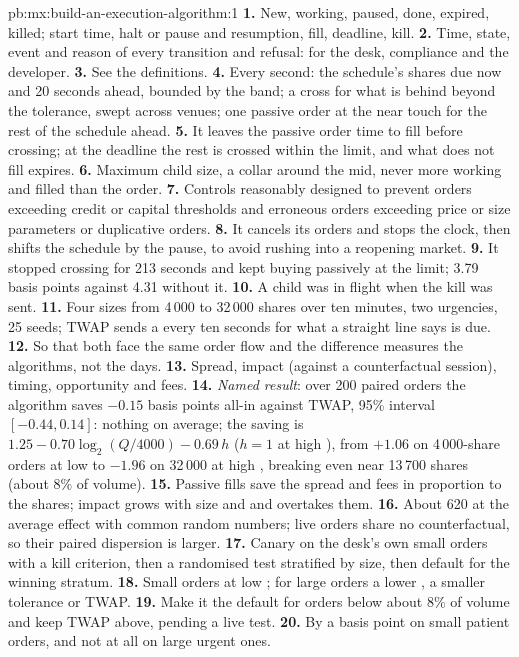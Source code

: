 \begin{solution}{pb:mx:build-an-execution-algorithm:1}
\textbf{1.} New, working, paused, done, expired, killed; start time, halt or pause and resumption, fill, deadline, kill.
\textbf{2.} Time, state, event and reason of every transition and refusal: for the desk, compliance and the developer.
\textbf{3.} See the definitions.
\textbf{4.} Every second: the schedule's shares due now and 20 seconds ahead, bounded by the band; a cross for what is behind beyond the tolerance,
swept across venues; one passive order at the near touch for the rest of the schedule ahead.
\textbf{5.} It leaves the passive order time to fill before crossing; at the deadline the rest is crossed within the limit, and what does not fill
expires.
\textbf{6.} Maximum child size, a collar around the mid, never more working and filled than the order.
\textbf{7.} Controls reasonably designed to prevent orders exceeding credit or capital thresholds and erroneous orders exceeding price or size parameters
or duplicative orders.
\textbf{8.} It cancels its orders and stops the clock, then shifts the schedule by the pause, to avoid rushing into a reopening market.
\textbf{9.} It stopped crossing for 213 seconds and kept buying passively at the limit; 3.79 basis points against 4.31 without it.
\textbf{10.} A child was in flight when the kill was sent.
\textbf{11.} Four sizes from 4\,000 to 32\,000 shares over ten minutes, two urgencies, 25 seeds; TWAP sends a  every ten seconds for what a
straight line says is due.
\textbf{12.} So that both face the same order flow and the difference measures the algorithms, not the days.
\textbf{13.} Spread, impact (against a counterfactual session), timing, opportunity and fees.
\textbf{14.} \emph{Named result}: over 200 paired orders the algorithm saves $-0.15$ basis points all-in against TWAP, 95\% interval $[-0.44, 0.14]$:
nothing on average; the saving is $1.25-0.70\log_2(Q/4000)-0.69\,h$ ($h=1$ at high ), from $+1.06$ on 4\,000-share orders at low  to $-1.96$
on 32\,000 at high , breaking even near 13\,700 shares (about 8\% of volume).
\textbf{15.} Passive fills save the spread and fees in proportion to the shares; impact grows with size and  and overtakes them.
\textbf{16.} About 620 at the average effect with common random numbers; live orders share no counterfactual, so their paired dispersion is larger.
\textbf{17.} Canary on the desk's own small orders with a kill criterion, then a randomised test stratified by size, then default for the winning stratum.
\textbf{18.} Small orders at low ; for large orders a lower , a smaller tolerance or TWAP.
\textbf{19.} Make it the default for orders below about 8\% of volume and keep TWAP above, pending a live test.
\textbf{20.} By a basis point on small patient orders, and not at all on large urgent ones.
\end{solution}

